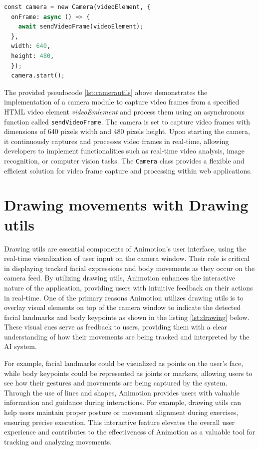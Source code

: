 \begin{lstlisting}[language=Python,caption=Camera utilization using CameraUtils,label=lst:camerautils]
  const camera = new Camera(videoElement, {
  onFrame: async () => {
    await sendVideoFrame(videoElement);
  },
  width: 640,
  height: 480,
  });
  camera.start();
\end{lstlisting}

The provided pseudocode \ref{lst:camerautils} above demonstrates the implementation of a camera module to capture video frames from 
a specified HTML video element \emph{videoEmlement} and process them using an asynchronous 
function called \texttt{sendVideoFrame}. The camera is set to capture video frames 
with dimensions of 640 pixels width and 480 pixels height. Upon starting the camera, it continuously captures 
and processes video frames in real-time, allowing developers to implement functionalities such as real-time video 
analysis, image recognition, or computer vision tasks. The \texttt{Camera} class provides a flexible and efficient 
solution for video frame capture and processing within web applications.

\section{Drawing movements with Drawing utils}
Drawing utils are essential components of Animotion's user interface, using the real-time visualization of user 
input on the camera window. Their role is critical in displaying tracked facial expressions and body movements as 
they occur on the camera feed. By utilizing drawing utils, Animotion enhances the interactive nature of the 
application, providing users with intuitive feedback on their actions in real-time.
One of the primary reasons Animotion utilizes drawing utils is to overlay visual elements on top of the camera window to 
indicate the detected facial landmarks and body keypoints as shown in the listing \ref{lst:drawing} below. These visual cues serve as feedback to users, 
providing them with a clear understanding of how their movements are being tracked and interpreted by the AI system. 

For example, facial landmarks could be visualized as points on the user's face, while body keypoints could be 
represented as joints or markers, allowing users to see how their gestures and movements are being captured by the system.
Through the use of lines and shapes, Animotion provides users with valuable information and guidance during interactions. 
For example, drawing utils can help users maintain proper posture or movement alignment during exercises, ensuring precise execution. 
This interactive feature elevates the overall user experience and contributes to the effectiveness of 
Animotion as a valuable tool for tracking and analyzing movements. \cite{drawingutils}

